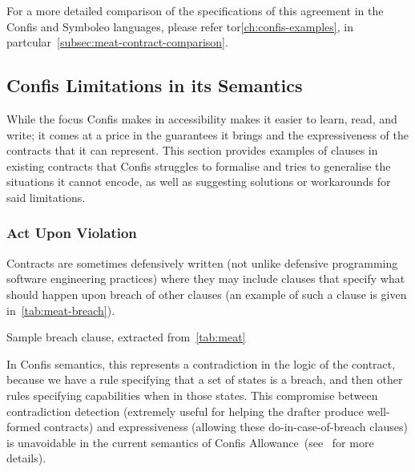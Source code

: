 For a more detailed comparison of the specifications of this agreement in the Confis and Symboleo languages, please refer tor\autoref{ch:confis-examples}, in partcular~\autoref{subsec:meat-contract-comparison}.

\subsection{Confis Limitations in its Semantics}\label{subsec:confis-lang-limits}

While the focus Confis makes in accessibility makes it easier to learn, read, and write;
it comes at a price in the guarantees it brings and the expressiveness of the contracts that it can represent.
This section provides examples of clauses in existing contracts that Confis struggles to formalise and tries to generalise the situations it cannot encode, as well as suggesting solutions or workarounds for said limitations.

\subsubsection{Act Upon Violation}
\label{subsubsec:limits-violations}

Contracts are sometimes defensively written (not unlike defensive programming software engineering practices) where they may include clauses that specify what should happen upon breach of other clauses (an example of such a clause is given in~\autoref{tab:meat-breach}).

\begin{table}[h]
    \centering
    \setlength{\fboxsep}{10pt}
    \caption[Sample breach clause]{Sample breach clause, extracted from~\autoref{tab:meat}}
    \label{tab:meat-breach}
\end{table}

In Confis semantics, this represents a contradiction in the logic of the contract, because we have a rule specifying that a set of states is a breach, and then other rules specifying capabilities when in those states.
This compromise between contradiction detection (extremely useful for helping the drafter produce well-formed contracts) and expressiveness (allowing these do-in-case-of-breach clauses) is unavoidable in the current semantics of Confis Allowance~(see~ for more details).

